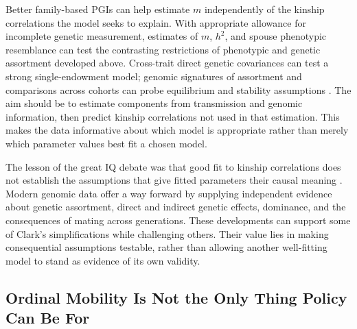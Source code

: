 \documentclass[12pt]{article}
\begin{document}
Better family-based PGIs can help estimate $m$ independently of the
kinship correlations the model seeks to explain. With appropriate allowance
for incomplete genetic measurement, estimates of $m$, $h^2$, and spouse
phenotypic resemblance can test the contrasting restrictions of phenotypic
and genetic assortment developed above. Cross-trait direct genetic
covariances can test a strong single-endowment model; genomic signatures
of assortment and comparisons across cohorts can probe equilibrium and
stability assumptions \citep[Sections~4.7 and~6.4]{BenjaminEtAl2026}.
The aim should be to estimate components from transmission and genomic
information, then predict kinship correlations not used in that estimation.
This makes the data informative about which model is appropriate rather
than merely which parameter values best fit a chosen model.

The lesson of the great IQ debate was that good fit to kinship correlations
does not establish the assumptions that give fitted parameters their causal
meaning \citep{Loehlin1978,Goldberger1978}. Modern genomic data offer a way
forward by supplying independent evidence about genetic assortment, direct
and indirect genetic effects, dominance, and the consequences of mating
across generations. These developments can support some of Clark's
simplifications while challenging others. Their value lies in making
consequential assumptions testable, rather than allowing another
well-fitting model to stand as evidence of its own validity.




\subsection{Ordinal Mobility Is Not the Only Thing Policy Can Be For}
\end{document}
